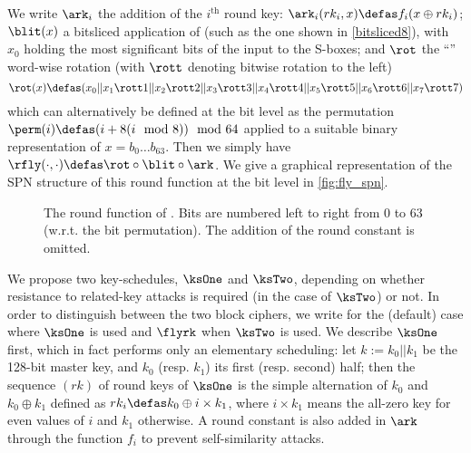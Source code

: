 We write $\ark_i$ the addition of the $i^\text{th}$ round key: $\ark_i(rk_i, x) \defas f_i(x \oplus rk_i)$;
$\blit(x)$ a bitsliced application of
\littlunOne (such as \eg the one shown in \autoref{bitsliced8}), with $x_0$ holding the most significant bits of the input to the S-boxes;
and $\rot$ the ``\shiftrow'' word-wise rotation (with $\rott$ denoting bitwise rotation to the left)
\[
\rot(x) \defas (x_0||x_1 \rott 1||x_2 \rott 2||x_3 \rott 3||x_4 \rott 4||x_5 \rott 5||x_6 \rott 6||x_7 \rott 7)
\]
which can alternatively be defined at the bit level as the permutation $\perm(i) \defas (i + 8(i \mod 8)) \mod 64$
applied to a suitable binary representation of $x = b_0\ldots b_{63}$. Then we simply have %
$\rfly(\cdot,\cdot) \defas \rot \circ \blit \circ \ark$.
We give a graphical representation of the SPN structure of this round function at the bit level in \autoref{fig:fly_spn}.

\begin{figure}[ht]
\centering

\caption[The round function of \fly.]{The round function of \fly.\label{fig:fly_spn} Bits are numbered left to right from 0 to 63 (w.r.t. the bit permutation). The addition of the round constant is
omitted.}
\end{figure}

\medskip


We propose two key-schedules, $\ksOne$ and $\ksTwo$, depending on whether resistance to related-key attacks is required (in the case of $\ksTwo$) or not.
In order to distinguish between the two block ciphers, we write \fly for the (default) case where $\ksOne$ is used and $\flyrk$ when $\ksTwo$ is used.
We describe $\ksOne$ first, which in fact performs only an elementary scheduling:
let $k := k_0||k_1$ be the 128-bit master key, and $k_0$ (resp. $k_1$) its first (resp. second) half; then 
the sequence $(rk)$ of round keys of $\ksOne$ is the simple alternation of $k_0$ and $k_0 \oplus k_1$ defined as $rk_i \defas k_0 \oplus i\times k_1$, where
$i\times k_1$
means the all-zero key for even values of $i$ and $k_1$ otherwise.
A round constant is also added in $\ark$ through the function $f_i$ to prevent self-similarity attacks.

